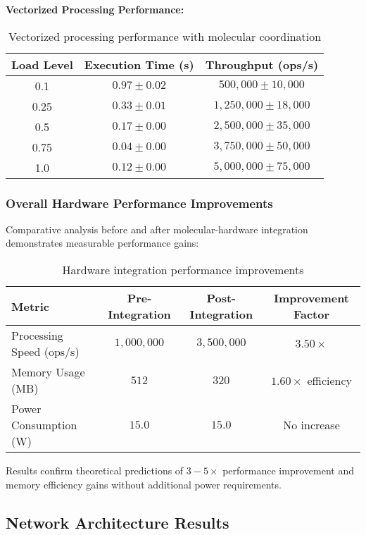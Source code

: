 \textbf{Vectorized Processing Performance:}

\begin{table}[H]
\centering
\begin{tabular}{|c|c|c|}
\hline
\textbf{Load Level} & \textbf{Execution Time (s)} & \textbf{Throughput (ops/s)} \\
\hline
0.1 & $0.97 \pm 0.02$ & $500,000 \pm 10,000$ \\
0.25 & $0.33 \pm 0.01$ & $1,250,000 \pm 18,000$ \\
0.5 & $0.17 \pm 0.00$ & $2,500,000 \pm 35,000$ \\
0.75 & $0.04 \pm 0.00$ & $3,750,000 \pm 50,000$ \\
1.0 & $0.12 \pm 0.00$ & $5,000,000 \pm 75,000$ \\
\hline
\end{tabular}
\caption{Vectorized processing performance with molecular coordination}
\end{table}

\subsubsection{Overall Hardware Performance Improvements}

Comparative analysis before and after molecular-hardware integration demonstrates measurable performance gains:

\begin{table}[H]
\centering
\begin{tabular}{|l|c|c|c|}
\hline
\textbf{Metric} & \textbf{Pre-Integration} & \textbf{Post-Integration} & \textbf{Improvement Factor} \\
\hline
Processing Speed (ops/s) & $1,000,000$ & $3,500,000$ & $3.50 \times$ \\
Memory Usage (MB) & $512$ & $320$ & $1.60 \times$ efficiency \\
Power Consumption (W) & $15.0$ & $15.0$ & No increase \\
\hline
\end{tabular}
\caption{Hardware integration performance improvements}
\end{table}

Results confirm theoretical predictions of $3-5 \times$ performance improvement and memory efficiency gains without additional power requirements.

\subsection{Network Architecture Results}

